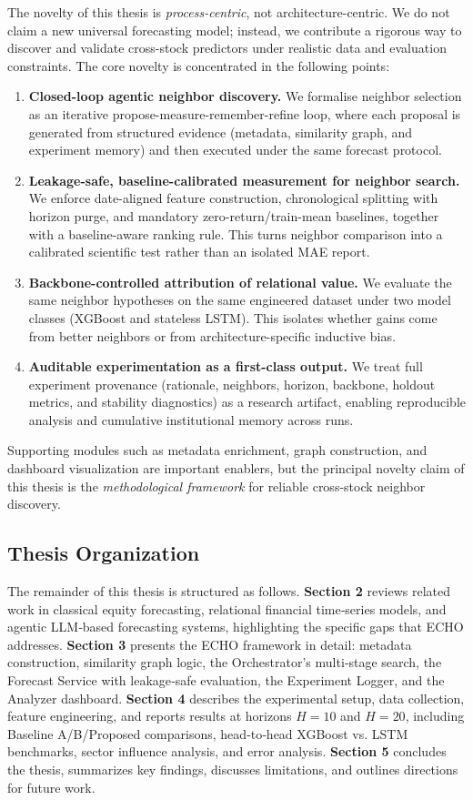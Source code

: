 \documentclass[12pt,a4paper,titlepage]{article}
\begin{document}
The novelty of this thesis is \emph{process-centric}, not architecture-centric. We do not claim a new universal forecasting model; instead, we contribute a rigorous way to discover and validate cross-stock predictors under realistic data and evaluation constraints. The core novelty is concentrated in the following points:
\begin{enumerate}
    \item \textbf{Closed-loop agentic neighbor discovery.} We formalise neighbor selection as an iterative propose-measure-remember-refine loop, where each proposal is generated from structured evidence (metadata, similarity graph, and experiment memory) and then executed under the same forecast protocol.
    \item \textbf{Leakage-safe, baseline-calibrated measurement for neighbor search.} We enforce date-aligned feature construction, chronological splitting with horizon purge, and mandatory zero-return/train-mean baselines, together with a baseline-aware ranking rule. This turns neighbor comparison into a calibrated scientific test rather than an isolated MAE report.
    \item \textbf{Backbone-controlled attribution of relational value.} We evaluate the same neighbor hypotheses on the same engineered dataset under two model classes (XGBoost and stateless LSTM). This isolates whether gains come from better neighbors or from architecture-specific inductive bias.
    \item \textbf{Auditable experimentation as a first-class output.} We treat full experiment provenance (rationale, neighbors, horizon, backbone, holdout metrics, and stability diagnostics) as a research artifact, enabling reproducible analysis and cumulative institutional memory across runs.
\end{enumerate}

Supporting modules such as metadata enrichment, graph construction, and dashboard visualization are important enablers, but the principal novelty claim of this thesis is the \emph{methodological framework} for reliable cross-stock neighbor discovery.

\subsection{Thesis Organization}

The remainder of this thesis is structured as follows. \textbf{Section 2} reviews related work in classical equity forecasting, relational financial time‑series models, and agentic LLM‑based forecasting systems, highlighting the specific gaps that ECHO addresses. \textbf{Section 3} presents the ECHO framework in detail: metadata construction, similarity graph logic, the Orchestrator’s multi‑stage search, the Forecast Service with leakage‑safe evaluation, the Experiment Logger, and the Analyzer dashboard. \textbf{Section 4} describes the experimental setup, data collection, feature engineering, and reports results at horizons \(H=10\) and \(H=20\), including Baseline A/B/Proposed comparisons, head‑to‑head XGBoost vs. LSTM benchmarks, sector influence analysis, and error analysis. \textbf{Section 5} concludes the thesis, summarizes key findings, discusses limitations, and outlines directions for future work.
\end{document}
